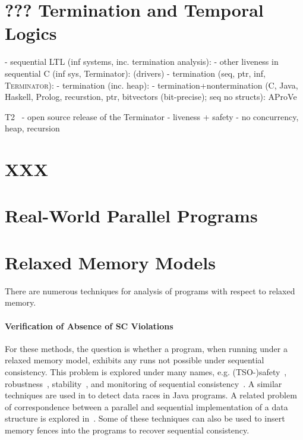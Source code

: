 \section{??? Termination and Temporal Logics}

- sequential LTL (inf systems, inc. termination analysis): \cite{Dietsch2015}
- other liveness in sequential C (inf sys, Terminator): \cite{Cook2007} (drivers)
- termination (seq, ptr, inf, \textsc{Terminator}): \cite{Cook2006}
- termination (inc. heap): \cite{Berdine2006}
- termination+nontermination (C, Java, Haskell, Prolog, recurstion, ptr, bitvectors (bit-precise); seq no structs): AProVe \cite{Hensel2017, Giesl2017}

T2~\cite{Brockschmidt2016}
- open source release of the Terminator
- liveness + safety
- no concurrency, heap, recursion

\section{XXX}

\section{Real-World Parallel Programs}


\section{Relaxed Memory Models}

There are numerous techniques for analysis of programs with respect to relaxed memory.

\paragraph{Verification of Absence of SC Violations}

For these methods, the question is whether a program, when running under a relaxed memory model, exhibits any runs not possible under sequential consistency.
This problem is explored under many names, e.g. (TSO-)safety~\cite{Burckhardt2008}, robustness~\cite{Bouajjani2013,Derevenetc2014}, stability~\cite{Alglave2011}, and monitoring of sequential consistency~\cite{Burnim2011}.
A similar techniques are used in \cite{Yang2004} to detect data races in Java programs.
A related problem of correspondence between a parallel and sequential implementation of a data structure is explored in~\cite{Ou2017}.
Some of these techniques can also be used to insert memory fences into the programs to recover sequential consistency.

